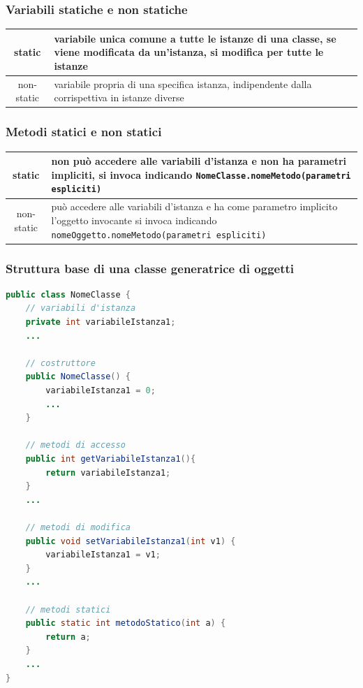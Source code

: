 \documentclass{article}
\begin{document}
\subsubsection*{Variabili statiche e non statiche}
\begin{center}
	\begin{tabularx}{\textwidth}{c X}
		static & variabile unica comune a tutte le istanze di una classe, se viene modificata da un'istanza, si modifica per
		tutte le istanze \\
		\midrule
		non-static & variabile propria di una specifica istanza, indipendente dalla corrispettiva in istanze diverse
	\end{tabularx}
\end{center}

\subsubsection*{Metodi statici e non statici}
\begin{center}
	\begin{tabularx}{\textwidth}{c X}
		static & non può accedere alle variabili d'istanza e non ha parametri impliciti, si invoca indicando
		\verb|NomeClasse.nomeMetodo(parametri espliciti)| \\
		\midrule
		non-static & può accedere alle variabili d'istanza e ha come parametro implicito l'oggetto invocante
		si invoca indicando \verb|nomeOggetto.nomeMetodo(parametri espliciti)|
	\end{tabularx}
\end{center}

\subsubsection*{Struttura base di una classe generatrice di oggetti}
\begin{lstlisting}[language=Java]
public class NomeClasse {
	// variabili d'istanza
	private int variabileIstanza1;
	...

	// costruttore
	public NomeClasse() {
		variabileIstanza1 = 0;
		...
	}

	// metodi di accesso
	public int getVariabileIstanza1(){
		return variabileIstanza1;
	}
	...

	// metodi di modifica
	public void setVariabileIstanza1(int v1) {
		variabileIstanza1 = v1;
	}
	...

	// metodi statici
	public static int metodoStatico(int a) {
		return a;
	}
	...
}
\end{lstlisting}
\end{document}

